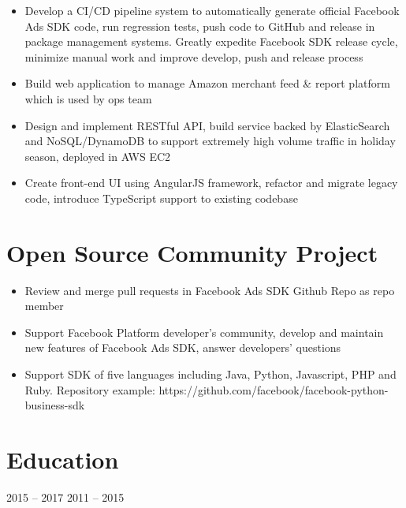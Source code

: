 \documentclass{resume}
\begin{document}
\begin{itemize}
    \item Develop a CI/CD pipeline system to automatically generate official Facebook Ads SDK code, run regression tests, push code to GitHub and release in package management systems. Greatly expedite Facebook SDK release cycle, minimize manual work and improve develop, push and release process
\end{itemize}


\begin{itemize}
    \item Build web application to manage Amazon merchant feed \& report platform which is used by ops team
    \item Design and implement RESTful API, build service backed by ElasticSearch and NoSQL/DynamoDB to support extremely high volume traffic in holiday season, deployed in AWS EC2
    \item Create front-end UI using AngularJS framework, refactor and migrate legacy code, introduce TypeScript support to existing codebase
\end{itemize}



\section{Open Source Community Project}


\begin{itemize}
    \item Review and merge pull requests in Facebook Ads SDK Github Repo as repo member
    \item Support Facebook Platform developer's community, develop and maintain new features of Facebook Ads SDK, answer developers' questions
    \item Support SDK of five languages including Java, Python, Javascript, PHP and Ruby. Repository example: https://github.com/facebook/facebook-python-business-sdk
\end{itemize}




\section{Education}


   {2015 -- 2017}
   {2011 -- 2015}
\end{document}
